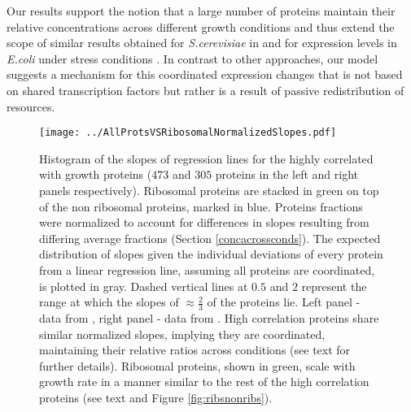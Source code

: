 \documentclass{article}
\newcommand{\hGlobal}{$473$}
\newcommand{\vnGlobal}{$305$}
\newcommand{\vGlobal}{\vnGlobal{}}
\begin{document}
Our results support the notion that a large number of proteins maintain their relative concentrations across different growth conditions and thus extend the scope of similar results obtained for \emph{S.cerevisiae} in \cite{Keren2013} and for expression levels in \emph{E.coli} under stress conditions \cite{Kaneko2014}.
In contrast to other approaches, our model suggests a mechanism for this coordinated expression changes that is not based on shared transcription factors but rather is a result of passive redistribution of resources.

\begin{figure}[H]
\begin{center}
\texttt{[image: ../AllProtsVSRibosomalNormalizedSlopes.pdf]}
\caption{\label{fig:globalfit}
    Histogram of the slopes of regression lines for the highly correlated with growth proteins (\hGlobal{} and \vGlobal{} proteins in the left and right panels respectively).
    Ribosomal proteins are stacked in green on top of the non ribosomal proteins, marked in blue.
    Proteins fractions were normalized to account for differences in slopes resulting from differing average fractions (Section \ref{concacrossconds}).
    The expected distribution of slopes given the individual deviations of every protein from a linear regression line, assuming all proteins are coordinated, is plotted in gray.
    Dashed vertical lines at $0.5$ and $2$ represent the range at which the slopes of $\approx \frac{2}{3}$ of the proteins lie.
    Left panel - data from \cite{Schmidt2015}, right panel - data from \cite{Peebo_2015}.
    High correlation proteins share similar normalized slopes, implying they are coordinated, maintaining their relative ratios across conditions (see text for further details).
    Ribosomal proteins, shown in green, scale with growth rate in a manner similar to the rest of the high correlation proteins (see text and Figure \ref{fig:ribsnonribs}).
%
}
\end{center}
\end{figure}
\end{document}
